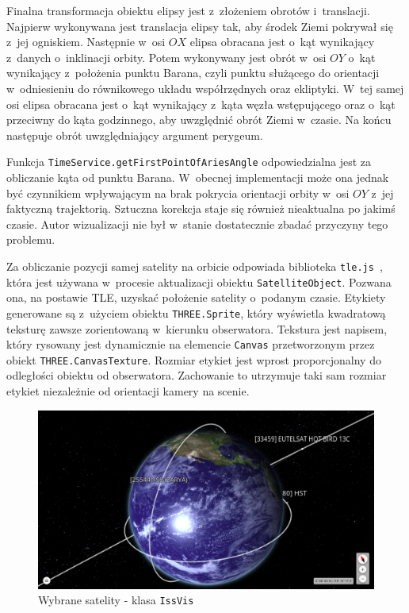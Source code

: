 Finalna transformacja obiektu elipsy jest z~złożeniem obrotów i~translacji. Najpierw wykonywana jest translacja elipsy tak, aby środek Ziemi pokrywał się z~jej ogniskiem. Następnie w~osi $OX$ elipsa obracana jest o~kąt wynikający z~danych o~inklinacji orbity.  Potem wykonywany jest obrót w~osi $OY$ o~kąt wynikający z~położenia punktu Barana, czyli punktu służącego do orientacji w~odniesieniu do równikowego układu współrzędnych oraz ekliptyki. W~tej samej osi elipsa obracana jest o~kąt wynikający z~kąta węzła wstępującego oraz o~kąt przeciwny do kąta godzinnego, aby uwzględnić obrót Ziemi w~czasie. Na końcu następuje obrót uwzględniający argument perygeum. 

Funkcja \texttt{TimeService.getFirstPointOfAriesAngle} odpowiedzialna jest za obliczanie kąta od punktu Barana. W~obecnej implementacji może ona jednak być czynnikiem wpływającym na brak pokrycia orientacji orbity w~osi $OY$ z~jej faktyczną trajektorią. Sztuczna korekcja staje się również nieaktualna po jakimś czasie. Autor wizualizacji nie był w~stanie dostatecznie zbadać przyczyny tego problemu. 

Za obliczanie pozycji samej satelity na orbicie odpowiada biblioteka \texttt{tle.js}~\cite{tle.js}, która jest używana w~procesie aktualizacji obiektu \texttt{SatelliteObject}. Pozwana ona, na postawie TLE, uzyskać położenie satelity o~podanym czasie. Etykiety generowane są z~użyciem obiektu \texttt{THREE.Sprite}, który wyświetla kwadratową teksturę zawsze zorientowaną w~kierunku obserwatora. Tekstura jest napisem, który rysowany jest dynamicznie na elemencie \texttt{Canvas} przetworzonym przez obiekt \texttt{THREE.CanvasTexture}. Rozmiar etykiet jest wprost proporcjonalny do odległości obiektu od obserwatora. Zachowanie to utrzymuje taki sam rozmiar etykiet niezależnie od orientacji kamery na scenie.

\begin{figure}
  \centering
  \includegraphics[width=\linewidth]{img/c4_issVis.png}
  \caption{Wybrane satelity - klasa \texttt{IssVis}}
  \label{fig:c4_issVis} 
\end{figure}

